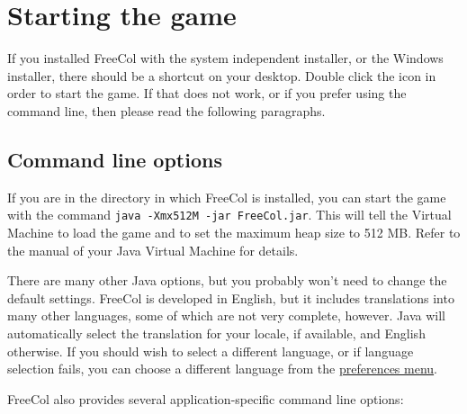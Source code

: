 \documentclass[12pt]{book}
\begin{document}
\hypertarget{Starting the game}{\section{Starting the game}}

If you installed FreeCol with the system independent installer, or the
Windows installer, there should be a shortcut on your desktop. Double
click the icon in order to start the game. If that does not work, or
if you prefer using the command line, then please read the following
paragraphs.


\hypertarget{Command line options}{\subsection{Command line options}}

If you are in the directory in which FreeCol is installed, you can
start the game with the command \verb$java -Xmx512M -jar FreeCol.jar$.
This will tell the Virtual Machine to load the game and to set the
maximum heap size to 512 MB. Refer to the manual of your Java Virtual
Machine for details.

There are many other Java options, but you probably won't need to
change the default settings. FreeCol is developed in English, but it
includes translations into many other languages, some of which are
not very complete, however. Java will automatically select the
translation for your locale, if available, and English otherwise. If
you should wish to select a different language, or if language
selection fails, you can choose a different language from the
\hyperlink{client options}{preferences menu}.

FreeCol also provides several application-specific command line
options:
\end{document}
